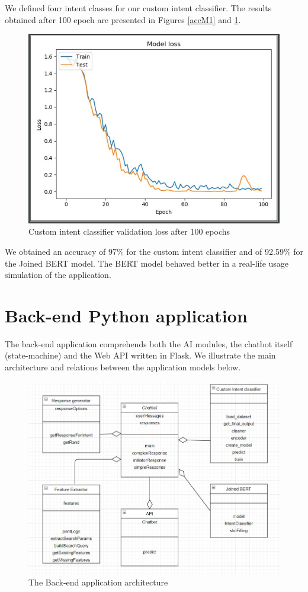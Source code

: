 \documentclass[runningheads,a4paper,11pt]{report}
\begin{document}
We defined four intent classes for our custom intent classifier. The results obtained after 100 epoch are presented in Figures \ref{accM1} and \ref{lossM1}.

\begin{figure}
\centerline{\includegraphics[width=12cm]{Img/m1loss.JPG}}  
	\caption{Custom intent classifier validation loss after 100 epochs}
	\label{lossM1}
\end{figure}

We obtained an accuracy of 97\% for the custom intent classifier and of 92.59\% for the Joined BERT model. The BERT model behaved better in a real-life usage simulation of the application.

\section{Back-end Python application}
\label{section:BE}

The back-end application comprehends both the AI modules, the chatbot itself (state-machine) and the Web API written in Flask. We illustrate the main architecture and relations between the application models below.

\begin{figure}
\centerline{\includegraphics[width=\linewidth]{Img/archDiagr.JPG}}  
	\caption{The Back-end application architecture}
	\label{beArch}
\end{figure}
\end{document}
